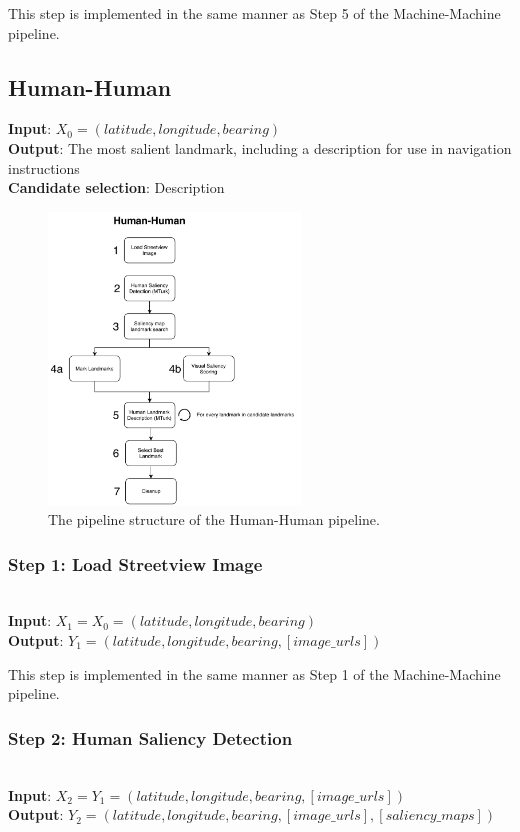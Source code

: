 This step is implemented in the same manner as Step 5 of the Machine-Machine pipeline.

\pagebreak
\subsection{Human-Human}
\noindent\textbf{Input}: $X_0 = (latitude, longitude, bearing)$\\
\textbf{Output}: The most salient landmark, including a description for use in navigation instructions\\
\textbf{Candidate selection}: Description

\begin{figure}[htbp]
  \centering
  \includegraphics[width=0.6\textwidth]{pipeline_diagrams/human-human.pdf}
  \caption{The pipeline structure of the Human-Human pipeline.}
  \label{fig:pipeline:hh}
\end{figure}

\subsubsection*{Step 1: Load Streetview Image}~\\
\noindent\textbf{Input}: $X_1 = X_0 = (latitude, longitude, bearing)$\\
\textbf{Output}: $Y_1 = (latitude, longitude, bearing, [image\_urls])$

This step is implemented in the same manner as Step 1 of the Machine-Machine pipeline.

\subsubsection*{Step 2: Human Saliency Detection}~\\
\noindent\textbf{Input}: $X_{2} = Y_1 = (latitude, longitude, bearing, [image\_urls])$\\
\textbf{Output}: $Y_{2} = (latitude, longitude, bearing, [image\_urls], [saliency\_maps])$ 

